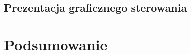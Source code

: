 \documentclass[eng,printmode]{mgr}
\begin{document}
 \section{Prezentacja graficznego sterowania}

\chapter{Podsumowanie}

\end{document}
